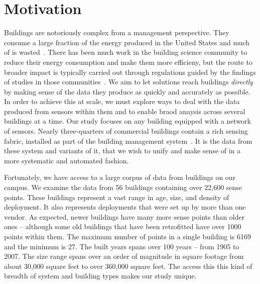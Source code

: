 \section{Motivation}

Buildings are notoriously complex from a management perspective.  They consume a large fraction
of the energy produced in the United States and much of is wasted~\cite{epa}.  There has been
much work in the building science community to reduce their energy consumption and make them more
efficieny, but the route to broader impact is typically carried out through regulations guided
by the findings of studies in those communities~\cite{regulation}.
We aim to let solutions reach buildings \emph{directly} by making sense of the data they produce
as quickly and accurately as possible.
In order to achieve this at scale, we must explore ways to deal with the data produced
from sensors within them and to enable braod anaysis across several buildings at a time. Our study
focuses on any building equipped with a network of sensors.  Nearly 
three-quarters of commercial buildings contain a rich sensing fabric, installed as part
of the building management system~\cite{study}.  
It is the data from these system and variants of it, that
we wish to unify and make sense of in a more systematic and automated fashion.

Fortunately, we have access to a large corpus of data from buildings on our campus.
We examine the data from 56 buildings containing over 22,600 sense points. These buildings 
represent a vast range in age, size, and density of deployment.  It also represents deployments
that were set up by more than one vendor.  As expected, newer buildings have many more sense 
points than older ones -- although some old buildings that have been retrofitted have over 1000  
points within them. The maximum number of points in a 
single building is 6169 and the minimum is 27.   The built years spans over 100 years -- from 
1905 to 2007. The size range spans over an order of magnitude 
in square footage from about 30,000 square feet to over 360,000 square feet.  The access this
this kind of breadth of system and building types makes our study unique.


